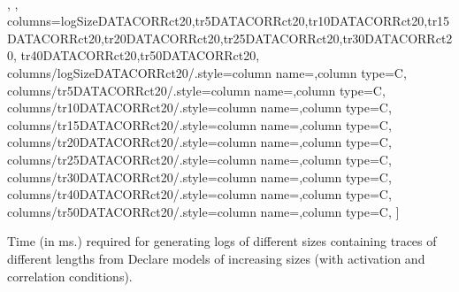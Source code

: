 \begin{small}
\begin{table}[t!]
\begin{center}
{{{            \\\midrule
		},
	},
	columns={logSizeDATACORRct20,tr5DATACORRct20,tr10DATACORRct20,tr15DATACORRct20,tr20DATACORRct20,tr25DATACORRct20,tr30DATACORRct20,
tr40DATACORRct20,tr50DATACORRct20},	
    columns/{logSizeDATACORRct20}/.style={column name={},column type=C},	
    columns/{tr5DATACORRct20}/.style={column name={},column type=C},
    columns/{tr10DATACORRct20}/.style={column name={},column type=C},
    columns/{tr15DATACORRct20}/.style={column name={},column type=C},
    columns/{tr20DATACORRct20}/.style={column name={},column type=C},
    columns/{tr25DATACORRct20}/.style={column name={},column type=C},
	columns/{tr30DATACORRct20}/.style={column name={},column type=C},
    columns/{tr40DATACORRct20}/.style={column name={},column type=C},
	columns/{tr50DATACORRct20}/.style={column name={},column type=C},
]{\fileTWENTYconstDATACORR}
}
\caption{Time (in ms.) required for generating logs of different sizes containing traces of different lengths from Declare models of increasing sizes (with activation and correlation conditions).}
\label{table:exp_results_real}
\end{center}
\end{table}
\end{small} 